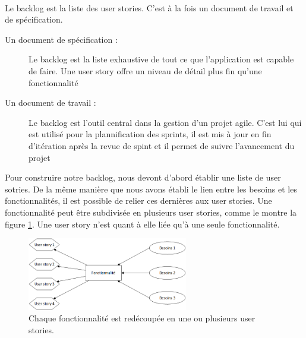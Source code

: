 			\paragraph{}%
			Le backlog est la liste des user stories. C'est à la fois un document de
			travail et de spécification.
			\begin{description}
				\item[Un document de spécification :] Le backlog est la liste exhaustive de
				tout ce que l'application est capable de faire. Une user story offre un
				niveau de détail plus fin qu'une fonctionnalité
				\item[Un document de travail :] Le backlog est l'outil central dans la
				gestion d'un projet agile. C'est lui qui est utilisé pour la plannification
				des sprints, il est mis à jour en fin d'itération après la revue de spint et
				il permet de suivre l'avancement du projet
			\end{description}
			Pour construire notre backlog, nous devont d'abord établir une liste de user
			sotries.
			De la même manière que nous avons établi le lien entre les besoins et
			les fonctionnalités, il est possible de relier ces dernières aux user
			stories.
			Une fonctionnalité peut être subdivisée en plusieurs user stories, comme le
			montre la figure \ref{mapping_fonctios_us}. Une user story n'est quant à elle
			liée qu'à une seule fonctionnalité.
			\begin{figure}[H]%
				\centering
				\includegraphics[width=7cm]{../img/part3/mapping_fonctios_us.png}
				\caption{\label{mapping_fonctios_us} Chaque fonctionnalité est redécoupée
				en une ou plusieurs user stories.}
			\end{figure}
			
